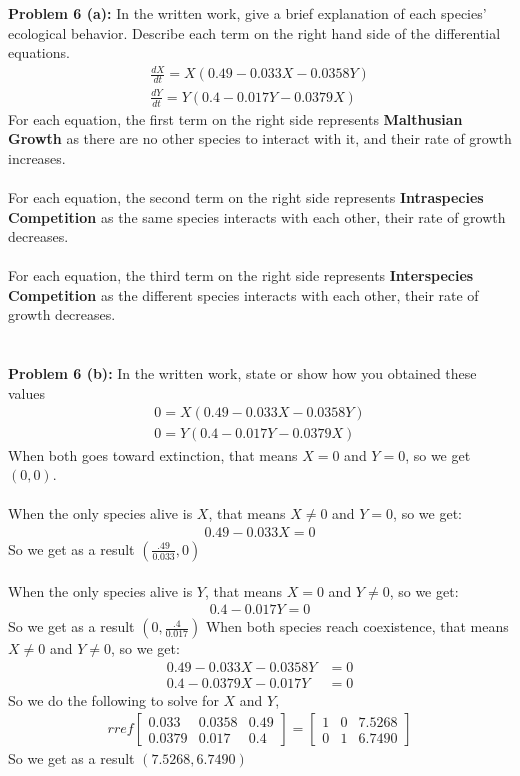 \documentclass[12pt]{article}
\begin{document}
\noindent \textbf{Problem 6 (a): }In the written work, give a brief explanation of each species' ecological behavior. Describe each term on the right hand side of the differential equations.
	\begin{align*}
	\frac{dX}{dt} = X(0.49 - 0.033 X - 0.0358 Y) \\
	\frac{dY}{dt} = Y(0.4 - 0.017 Y - 0.0379 X)
	\end{align*}
For each equation, the first term on the right side represents \textbf{Malthusian Growth} as there are no other species to interact with it, and their rate of growth increases.
\\ \\
For each equation, the second term on the right side represents \textbf{Intraspecies Competition} as the same species interacts with each other, their rate of growth decreases. 	
\\ \\ 
For each equation, the third term on the right side represents \textbf{Interspecies Competition} as the different species interacts with each other, their rate of growth decreases. 	
\\ \\ \\
\noindent \textbf{Problem 6 (b): }In the written work, state or show how you obtained these values 
	\begin{align*}
	0 = X(0.49 - 0.033 X - 0.0358 Y) \\
	0 = Y(0.4 - 0.017 Y - 0.0379 X)
	\end{align*}
When both goes toward extinction, that means $X = 0$ and $Y = 0$, so we get $(0,0)$.
\\ \\
When the only species alive is $X$, that means $X \not = 0$ and $Y = 0$, so we get:
	\begin{align*}
		0.49 - 0.033X = 0
	\end{align*}
So we get as a result $\left(\frac{.49}{0.033},0\right)$
\\ \\
When the only species alive is $Y$, that means $X = 0$ and $Y \not = 0$, so we get:
\begin{align*}
0.4 - 0.017Y = 0
\end{align*}
So we get as a result $\left(0,\frac{.4}{0.017}\right)$
When both species reach coexistence, that means $X \not = 0$ and $Y \not = 0$, so we get:
	\begin{align*}
		0.49 - 0.033 X - 0.0358 Y &= 0 \\
		0.4 - 0.0379 X - 0.017 Y &= 0
	\end{align*} 
So we do the following to solve for $X$ and $Y$,
	\begin{align*}
		rref
		\begin{bmatrix}
			 0.033 & 0.0358 & 0.49 \\
			 0.0379 & 0.017 & 0.4 
		\end{bmatrix} = 
		\begin{bmatrix}
			1 & 0 & 7.5268 \\
			0 & 1 & 6.7490
		\end{bmatrix}
	\end{align*}
So we get as a result $(7.5268, 6.7490)$
	
\end{document}
